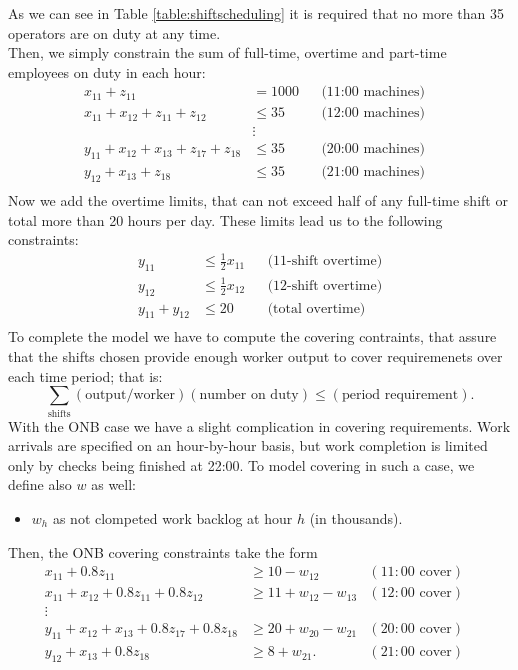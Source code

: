 \documentclass[a4paper,10 pt,titlepage,twoside]{book}
\theoremstyle{plain}
\theoremstyle{definition}
\theoremstyle{remark}
\begin{document}
As we can see in Table \ref{table:shiftscheduling} it is required that no more than 35 operators are on duty at any time. \\Then, we simply constrain the sum of full-time, overtime and part-time employees on duty in each hour:
\begin{align*}
x_{11}+z_{11}&= 1000&&\text{(11:00 machines)}&\\
x_{11}+x_{12}+z_{11}+z_{12}&\leq 35&&\text{(12:00 machines)}&\\
&\vdots&&\\
y_{11}+x_{12}+x_{13}+z_{17}+z_{18}&\leq35&&\text{(20:00 machines)}&\\
y_{12}+x_{13}+z_{18}&\leq35&&\text{(21:00 machines)}&\\
\end{align*}
Now we add the overtime limits, that can not exceed half of any full-time shift or total more than 20 hours per day. These limits lead us to the following constraints:
\begin{align*}
y_{11}&\leq \frac{1}{2}x_{11}&&\text{(11-shift overtime)}\\
      y_{12}&\leq \frac{1}{2}x_{12}&&\text{(12-shift overtime)}\\
y_{11}+y_{12}&\leq 20&&\text{(total overtime)}\\
\end{align*}
To complete the model we have to compute the covering contraints, that assure that the shifts chosen provide enough worker output to cover requiremenets over each time period; that is:
\begin{equation*}
\sum\limits_{\text{shifts}}(\text{output/worker})(\text{number on duty})\leq(\text{period requirement}).
\end{equation*}		
With the ONB case we have a slight complication in covering requirements. Work arrivals are specified on an hour-by-hour basis, but work completion is limited only by checks being finished at 22:00. To model covering in such a case, we define also $w$ as well:
\begin{itemize}
	\item $w_{h}$ as not clompeted work backlog at hour $h$ (in thousands).
\end{itemize}
Then, the ONB covering constraints take the form
\begin{align*}
x_{11}+0.8z_{11}&\geq 10 - w_{12}&(11:00 \text{ cover})&\\
x_{11}+x_{12}+0.8z_{11}+0.8z_{12}&\geq11 +w_{12}-w_{13}&(12:00 \text{ cover})&\\
\vdots&&&\\
y_{11}+x_{12}+x_{13}+0.8z_{17}+0.8z_{18}&\geq 20 +w_{20}-w_{21}&(20:00 \text{ cover})&\\
y_{12}+x_{13}+0.8z_{18}&\geq 8 +w_{21}.&(21:00 \text{ cover})&\\
\end{align*}
\end{document}
